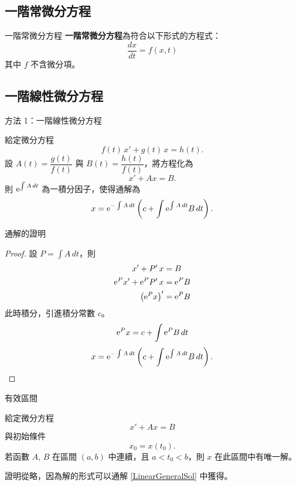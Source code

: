 \documentclass{beamer}
\newcommand  {\e}{\textup e}
\theoremstyle{remark}
\begin{document}
\begin{CJK}{UTF8}{bsmi}
\section[一階 ODE]{一階常微分方程}
\begin{frame}{一階常微分方程}
  \textbf{一階常微分方程}為符合以下形式的方程式：
  \[ \frac{dx}{dt} = f(x,t) \]
  其中 $f$ 不含微分項。
\end{frame}

\subsection[線性]{一階線性微分方程}
\begin{frame}{方法 1：一階線性微分方程}
  \begin{theorem}
    給定微分方程
    \[f(t)\,x' + g(t)\,x = h(t).\]
    設 $A(t) = \dfrac{g(t)}{f(t)}$ 與 $B(t) = \dfrac{h(t)}{f(t)}$，將方程化為
    \[x' + Ax = B.\]
    則 $\e^{\int A\,dt}$ 為一積分因子，使得通解為
    \[x = \e^{-\int A\,dt} \left( c + \int \e^{\int A\,dt} B\,dt \right).\]
  \end{theorem}
\end{frame}

\begin{frame}{通解的證明}
  \begin{proof}
    設 $P = \int A\,dt$，則
    \begin{align*}
      x' + P'\,x &= B \\
      \e^P x' + \e^P P'\,x &= \e^P B \\
      \left( \e^P x \right)' &= \e^P B
    \end{align*}
    此時積分，引進積分常數 $c$。
    \[ \e^P x = c + \int \e^P B\,dt \]
    \begin{equation}
      x = \e^{-\int A\,dt} \left( c + \int \e^{\int A\,dt} B\,dt \right).
      \qedhere \label{LinearGeneralSol}
    \end{equation}
  \end{proof}
\end{frame}

\begin{frame}{有效區間}
  \begin{theorem}
    給定微分方程
    \[ x' + Ax = B \]
    與初始條件
    \[ x_0 = x(t_0).\]
    若函數 $A$, $B$ 在區間 $(a, b)$ 中連續，且 $a < t_0 < b$，則 $x$
    在此區間中有唯一解。
  \end{theorem}

  證明從略，因為解的形式可以通解 \eqref{LinearGeneralSol} 中獲得。
\end{frame}


\end{CJK}
\end{document}
